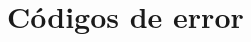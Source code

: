 \documentclass[stu, 12pt, letterpaper, donotrepeattitle, floatsintext, natbib, helv]{apa7}
\begin{document}
\section*{Códigos de error}
{}




\newpage
\renewcommand\refname{\large\textbf{Referencias}}

\end{document}
